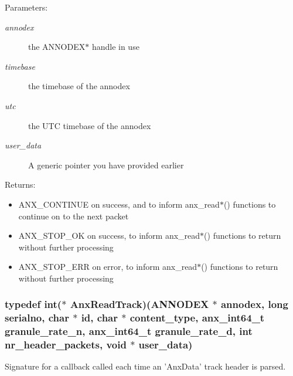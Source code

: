\begin{Desc}
\item[Parameters:]
\begin{description}
\item[{\em annodex}]the ANNODEX$\ast$ handle in use \item[{\em timebase}]the timebase of the annodex \item[{\em utc}]the UTC timebase of the annodex \item[{\em user\_\-data}]A generic pointer you have provided earlier \end{description}
\end{Desc}
\begin{Desc}
\item[Returns:]\begin{itemize}
\item ANX\_\-CONTINUE on success, and to inform anx\_\-read$\ast$() functions to continue on to the next packet\item ANX\_\-STOP\_\-OK on success, to inform anx\_\-read$\ast$() functions to return without further processing\item ANX\_\-STOP\_\-ERR on error, to inform anx\_\-read$\ast$() functions to return without further processing \end{itemize}
\end{Desc}
\subsubsection{\setlength{\rightskip}{0pt plus 5cm}typedef int($\ast$ {\bf Anx\-Read\-Track})({\bf ANNODEX} $\ast$ annodex, long serialno, char $\ast$ id, char $\ast$ content\_\-type, {\bf anx\_\-int64\_\-t} granule\_\-rate\_\-n, {\bf anx\_\-int64\_\-t} granule\_\-rate\_\-d, int nr\_\-header\_\-packets, void $\ast$ user\_\-data)}\label{anx__read_8h_a1}


Signature for a callback called each time an 'Anx\-Data' track header is parsed. 

